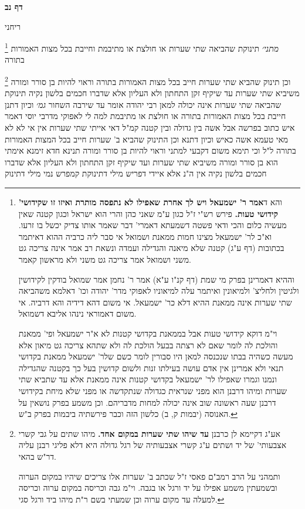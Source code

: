 \documentclass[12pt, openany]{book}
\newcommand{\sethebfont}{
\fontsize{10.5pt}{21.0pt} \selectfont
}
\newcommand{\twocol}[1]{
	{\sethebfont \begin{multicols}{2}
			#1
	\end{multicols}}	
}
\newcommand{\sectname}{}
\newcommand{\newsection}[1]{
	\addcontentsline{toc}{section}{#1}
	\renewcommand{\sectname}{#1}	
	\vspace{-\baselineskip}
	\begin{center}
		\textbf{%
\fontsize{16pt}{16pt}\selectfont
			#1}
	\end{center}
	\vspace{-\baselineskip}
	\nopagebreak
}
\newcommand{\footnotecomment}[1]{
	\renewcommand\thefootnote{}
	\footnote{#1}}
\newcommand{\commenta}[1]{\footnotecomment{#1}}
\begin{document}
\newsection{דף נב}
\twocol{ריחני
\commenta{והא ד\textbf{אמר ר' ישמעאל ויש לך אחרת שאפילו לא נתפסה מותרת ואיזו זו שקידושי' קידושי טעות.} פירש רש"י ז"ל כגון ע"מ שאני כהן והרי הוא ישראל וכגון קטנה שאין מעשיה כלום והכי ודאי פשטה דשמעתא דאמרי' דבר שאמר אותו צדיק יכשל בו זרעו. וא"כ לר' ישמעאל מצינו חמות ממאנת ושמואל אי סבר ליה כרביה ההוא דאיתמר בכתובות (דף ע"ג) קטנה שלא מיאנה והגדילה ועמדה ונשאת רב אמר אינה צריכה גט משני ושמואל אמר צריכה גט משני ולא מראשון קאמר.\par וההיא דאמרינן בפרק מי שמת (דף קנ"ו ע"א) אמר ר' נחמן אמר שמואל בודקין לקידושין ולגיטין ולחליצ' ולמיאונין ואיתמר עלה למיאוניו לאפוקי מדר' יהודה וכו' דאלמא משהביאה שתי שערות אינה ממאנת ההיא דלא כר' ישמעאל. אי משום דהא דידיה והא דרביה. אי משום דאמוראי נינהו אליבא דשמואל.\par וי"מ דוקא קידושי טעות אבל בממאנת בקדושי קטנות לא א"ר ישמעאל ופי' ממאנת והולכת לה לומר שאם לא רצתה בבעל הולכת לה ולא שתהא צריכה גט מיאון אלא מעשה כשהיה בבתו שנכנסה למאן היו סבורין לומר כשם שלר' ישמעאל ממאנת בקדושי תנאי ולא אמרינן אין אדם עושה בעילתו זנות ולשום קדושין בעל כך בקטנה שהגדילה ונמנו וגמרו שאפילו לר' ישמעאל בקדושי קטנות אינה ממאנת אלא עד שתביא שתי שערות ומיהו דרבנן הוא מפני שנראית כגדולה שנתקדשה או מפני שלא מיחת בקידושי דרבנן שעה ראשונה שוב אינה יכולה למחות מדבריהם. וכן משמע בפרק נושאין על האנוסה (יבמות ק, ב) כלשון הזה וכבר פירשתיה ביבמות בפרק ב"ש. }
{\large\emph{מתני׳}} תינוקת שהביאה שתי שערות או חולצת או מתיבמת וחייבת בכל מצות האמורות בתורה
\commenta{אע"ג דקיימא לן כרבנן \textbf{עד שיהו שתי שערות במקום אחד.} מיהו שתים על גבי קשרי אצבעותי' של יד ושתים ע"ג קשרי אצבעותיה של רגל גדולה היא דלא פליגי רבנן עליה דר"ש בהאי.\par ותמהני על הרב רמב"ם פאסי ז"ל שכתב ב' שערות אלו צריכים שיהיו במקום הערוה ובשמעתין משמע אפילו על יד ורגל או בגבה. וי"מ גבה וכריסה במקום ערוה וכריסה למעלה עד מקום ערוה וכן שמעתי בשם ר"ת מיהו ביד ורגל סגי. }
וכן תינוק שהביא שתי שערות חייב בכל מצות האמורות בתורה וראוי להיות בן סורר ומורה משיביא שתי שערות עד שיקיף זקן 
התחתון ולא העליון אלא שדברו חכמים בלשון נקיה 
תינוקת שהביאה שתי שערות אינה יכולה למאן רבי יהודה אומר עד שירבה השחור
{\large\emph{גמ׳}} וכיון דתנן חייבת בכל מצות האמורות בתורה או חולצת או מתיבמת למה לי
לאפוקי מדרבי יוסי דאמר איש כתוב בפרשה אבל אשה בין גדולה ובין קטנה קמ"ל דאי אייתי שתי שערות אין אי לא לא מאי טעמא אשה כאיש
וכיון דתנא וכן התינוק שהביא ב' שערות חייב בכל המצות האמורות בתורה ל"ל 
וכי תימא משום דקבעי למתני וראוי להיות בן סורר ומורה תנינא חדא זימנא אימתי הוא בן סורר ומורה משיביא שתי שערות ועד שיקיף זקן התחתון ולא העליון אלא שדברו חכמים בלשון נקיה 
אין ה"נ אלא איידי דפריש מילי דתינוקת קמפרש נמי מילי דתינוק
}
\end{document}

